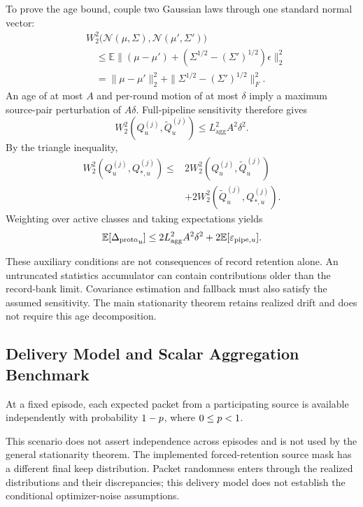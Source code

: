To prove the age bound, couple two Gaussian laws through one standard normal vector:
\begin{equation}
\begin{split}
 &W_2^2\bigl(\mathcal N(\mu,\Sigma),\mathcal N(\mu',\Sigma')\bigr)\\
 &\quad\le
 \mathbb E\|(\mu-\mu')+
       (\Sigma^{1/2}-(\Sigma')^{1/2})\epsilon\|_2^2\\
 &\quad=
 \|\mu-\mu'\|_2^2+
 \|\Sigma^{1/2}-(\Sigma')^{1/2}\|_F^2.
\end{split}
\label{eq:supp_gaussian_coupling}
\end{equation}
An age of at most $A$ and per-round motion of at most $\delta$ imply a maximum source-pair perturbation of $A\delta$. Full-pipeline sensitivity therefore gives
\begin{equation}
 W_2^2(Q_u^{(j)},\widetilde Q_u^{(j)})
 \le L_{\mathrm{agg}}^2A^2\delta^2.
\end{equation}
By the triangle inequality,
\begin{equation*}
\begin{split}
 W_2^2(Q_u^{(j)},Q_{*,u}^{(j)})
 \le{}&2W_2^2(Q_u^{(j)},\widetilde Q_u^{(j)})\\
 &+2W_2^2(\widetilde Q_u^{(j)},Q_{*,u}^{(j)}).
\end{split}
\end{equation*}
Weighting over active classes and taking expectations yields
\begin{equation}
 \mathbb E[{\Delta_{\mathrm{proto}}}_u]\le
 2L_{\mathrm{agg}}^2A^2\delta^2
 +2\mathbb E[\varepsilon_{\mathrm{pipe},u}].
 \label{eq:supp_age_bound}
\end{equation}

These auxiliary conditions are not consequences of record retention alone. An untruncated statistics accumulator can contain contributions older than the record-bank limit. Covariance estimation and fallback must also satisfy the assumed sensitivity. The main stationarity theorem retains realized drift and does not require this age decomposition.

\subsection{Delivery Model and Scalar Aggregation Benchmark}

\begin{assumption}
\label{asm:participation}
At a fixed episode, each expected packet from a participating source is available independently with probability $1-p$, where $0\le p<1$.
\end{assumption}
This scenario does not assert independence across episodes and is not used by the general stationarity theorem. The implemented forced-retention source mask has a different final keep distribution. Packet randomness enters through the realized distributions and their discrepancies; this delivery model does not establish the conditional optimizer-noise assumptions.

